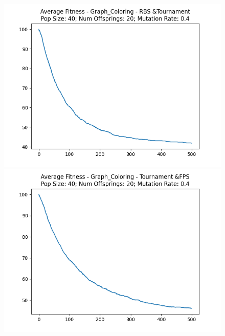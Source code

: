 \documentclass[12pt]{report}
\theoremstyle{mytheoremstyle}
\theoremstyle{mytheoremstyle}
\theoremstyle{myproblemstyle}
\begin{document}
\begin{figure}[!]
\begin{minipage}{0.4\textwidth}
	\end{minipage}
	\vspace*{1cm}
	\begin{minipage}{0.4\textwidth}
		\includegraphics[width=\linewidth]{../Analysis/ASF_Graph_Coloring_1_2_40_20.png}
	\end{minipage}
	\hspace{\fill}
	\begin{minipage}{0.4\textwidth}
		\includegraphics[width=\linewidth]{../Analysis/ASF_Graph_Coloring_2_0_40_20.png}
	\end{minipage}
	\vspace*{1cm}
	\begin{minipage}{0.4\textwidth}

\end{minipage}
\end{figure}
\end{document}
